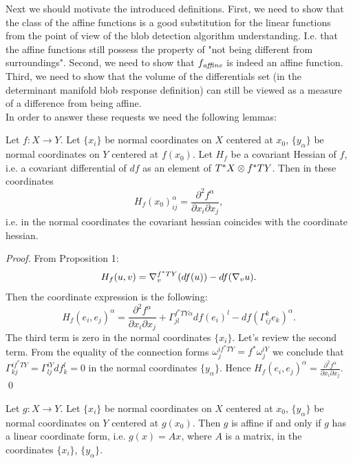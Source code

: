 \documentclass[twocolumn]{svjour3}          %
\newcommand{\affine}{\mathop{\it affine}}
\newcommand{\CovariantDerivManif}[2]{\tensor*{\nabla}{^{#1}_{#2}}}
\newcommand{\CovariantDeriv}[1]{\nabla_{#1}}
\newcommand{\TangentBundle}[1]{T{#1}}
\newcommand{\CotangentBundle}[1]{\tensor*{T}{^{*}}{#1}}
\newcommand {\Preimage}[2]{{#2}^*{#1}}
\newcommand \TPreimage[2]{\Preimage{\TangentBundle{#1}}{#2}}
\newcommand {\DiffSpace}[3]{\CotangentBundle{#1}\otimes \TPreimage{#2}{#3}}
\begin{document}
Next we should motivate the introduced definitions. First, we need to show that the class of the affine functions is a good substitution for the linear functions from the point of view of the blob detection algorithm understanding. I.e. that the affine functions still possess the property of "not being different from surroundings". Second, we need to show that $f_{\affine}$ is indeed an affine function. Third, we need to show that the volume of the differentials set (in the determinant manifold blob response definition) can still be viewed as a measure of a difference from being affine. 
\\
In order to answer these requests we need the following lemmas:

\begin{lemma}\label{HessianCoordinate}
Let $f:X \to Y$. Let $\{x_i\}$ be normal coordinates on $X$ centered at $x_0$, $\{y_{\alpha}\}$ be normal coordinates on $Y$ centered at $f(x_0)$. Let $H_f$ be a covariant Hessian of $f$, i.e. a covariant differential of $df$ as an element of $\DiffSpace{X}{Y}{f}$. Then in these coordinates
$$H_f(x_0)_{ij}^{\alpha} = \frac{\partial^2 f^{\alpha}}{\partial x_i \partial x_j},$$
i.e. in the normal coordinates the covariant hessian coincides with the coordinate hessian.
\end{lemma}

\begin{proof}
From \cite{RiemannianBlob} Proposition 1: 
$$H_f(u, v) = \CovariantDerivManif{\TPreimage{Y}{f}}{v}(df(u)) - df(\CovariantDeriv{v}u).$$
Then the coordinate expression is the following: 
$$H_f(e_i, e_j)^{\alpha} = \frac{\partial^2 f^{\alpha}}{\partial x_i \partial x_j} + \Gamma^{\TPreimage{Y}{f}\alpha}_{jl}df(e_i)^l - df(\Gamma^k_{ij}e_k)^{\alpha}.$$
The third term is zero in the normal coordinates $\{x_i\}$. Let's review the second term. From the equality of the connection forms $\omega^{i\TPreimage{Y}{f}}_j = f^*\omega^{i Y}_j$ we conclude that $\Gamma^{i\TPreimage{Y}{f}}_{kj}=\Gamma^{iY}_{lj}df^l_k = 0$ in the normal coordinates $\{y_{\alpha}\}$. Hence 
$H_f(e_i, e_j)^{\alpha} = \frac{\partial^2 f^{\alpha}}{\partial x_i \partial x_j}$. \qed
\end{proof}

\begin{lemma}\label{AffineLinear}
Let $g:X \to Y$. Let $\{x_i\}$ be normal coordinates on $X$ centered at $x_0$, $\{y_{\alpha}\}$ be normal coordinates on $Y$ centered at $g(x_0)$. Then $g$ is affine if and only if $g$ has a linear coordinate form, i.e. $g(x) = Ax$, where $A$ is a matrix, in the coordinates $\{x_i\}$, $\{y_{\alpha}\}$.
\end{lemma}
\end{document}
